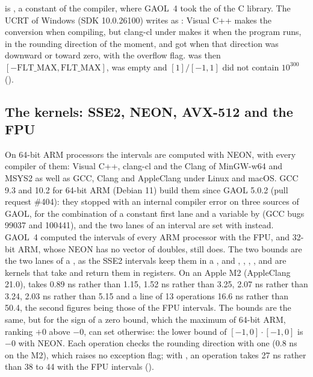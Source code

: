 \medskip
{} is , a
constant of the compiler, where GAOL~4 took the  of the C
library.\newinvfive{} The UCRT of Windows (SDK 10.0.26100) writes
 as : Visual C++ makes the
conversion when compiling, but clang-cl under  makes it
when the program runs, in the rounding direction of the moment, and got
 when that direction was downward or toward zero, with the
overflow flag.  was then $[-\mathrm{FLT\_MAX},
\mathrm{FLT\_MAX}]$,  was empty and $[1]/[-1, 1]$ did
not contain $10^{300}$ ().

\subsection{The kernels: SSE2, NEON, AVX-512 and the FPU}
\label{sec:changes-kernels}
%

On 64-bit ARM processors the intervals are computed with NEON, with every
compiler of them: Visual C++, clang-cl and the Clang of MinGW-w64 and MSYS2 as
well as GCC, Clang and AppleClang under Linux and macOS.\newinvfive{} GCC 9.3
and 10.2 for 64-bit ARM (Debian 11) build them since GAOL 5.0.2 (pull request
\#404): they stopped with an internal compiler error on three sources of GAOL,
for the combination of a constant first lane and a variable by
 (GCC bugs 99037 and 100441), and the two lanes of an
interval are set with  instead. GAOL~4
computed the intervals of every ARM processor with the FPU, and 32-bit ARM,
whose NEON has no vector of doubles, still does. The two bounds are the two
lanes of a , as the SSE2 intervals keep them in a
, and \code{+}, \code{-}, \code{*}, \code{/}, 
and  are kernels that take and return them in registers. On an
Apple M2 (AppleClang 21.0),  takes 0.89 ns rather than 1.15,  1.52 ns rather than 3.25,  2.07 ns rather than 3.24,  2.03 ns rather than 5.15 and a line of 13 operations 16.6 ns rather than 50.4, the second figures being those of the FPU intervals. The
bounds are the same, but for the sign of a zero bound, which the maximum of
64-bit ARM, ranking $+0$ above $-0$, can set otherwise: the lower bound of
$[-1, 0] \cdot [-1, 0]$ is $-0$ with NEON. Each operation checks the rounding
direction with one  (0.8 ns on the M2), which raises no exception
flag; with , an operation takes 27 ns rather
than 38 to 44 with the FPU intervals ().

